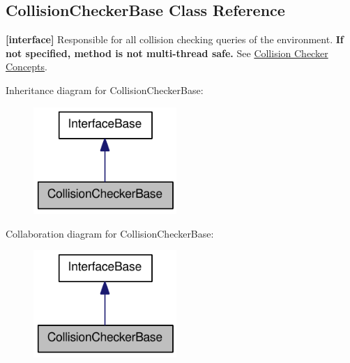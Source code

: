 \hypertarget{classOpenRAVE_1_1CollisionCheckerBase}{
\subsection{CollisionCheckerBase Class Reference}
\label{classOpenRAVE_1_1CollisionCheckerBase}
}


{\bfseries \mbox{[}interface\mbox{]}} Responsible for all collision checking queries of the environment. {\bfseries If not specified, method is not multi-\/thread safe.} See \hyperlink{arch__collisionchecker}{Collision Checker Concepts}.  




Inheritance diagram for CollisionCheckerBase:\nopagebreak
\begin{figure}[H]
\begin{center}
\leavevmode
\includegraphics[width=154pt]{classOpenRAVE_1_1CollisionCheckerBase__inherit__graph}
\end{center}
\end{figure}


Collaboration diagram for CollisionCheckerBase:\nopagebreak
\begin{figure}[H]
\begin{center}
\leavevmode
\includegraphics[width=154pt]{classOpenRAVE_1_1CollisionCheckerBase__coll__graph}
\end{center}
\end{figure}
